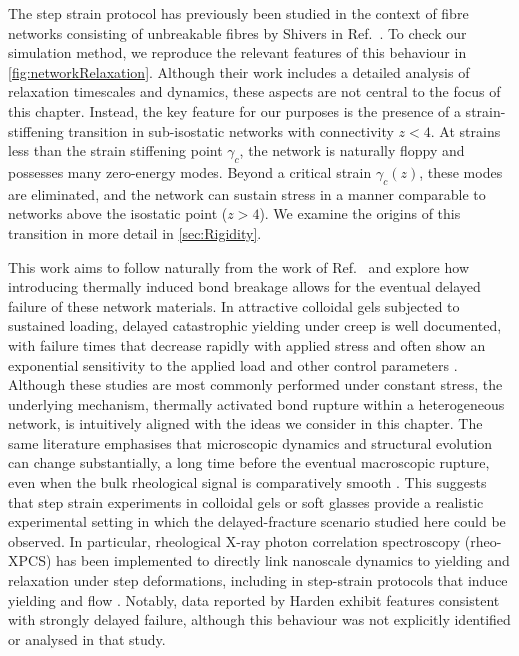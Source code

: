 The step strain protocol has previously been studied in the context of fibre networks consisting of unbreakable fibres by Shivers \etal in Ref.~\cite{shivers_strain-controlled_2023}. To check our simulation method, we reproduce the relevant features of this behaviour in \cref{fig:networkRelaxation}. Although their work includes a detailed analysis of relaxation timescales and dynamics, these aspects are not central to the focus of this chapter. Instead, the key feature for our purposes is the presence of a strain-stiffening transition in sub-isostatic networks with connectivity $z<4$. At strains less than the strain stiffening point $\gamma_c$, the network is naturally floppy and possesses many zero-energy modes. Beyond a critical strain $\gamma_c(z)$, these modes are eliminated, and the network can sustain stress in a manner comparable to networks above the isostatic point ($z>4$). We examine the origins of this transition in more detail in \cref{sec:Rigidity}.

This work aims to follow naturally from the work of Ref.~\cite{lockwood_ultradelayed_2025} and explore how introducing thermally induced bond breakage allows for the eventual delayed failure of these network materials. In attractive colloidal gels subjected to sustained loading, delayed catastrophic yielding under creep is well documented, with failure times that decrease rapidly with applied stress and often show an exponential sensitivity to the applied load and other control parameters \cite{sprakel_stress_2011,blindstrom_structures_2012,Landrum2016,Brenner2013}. Although these studies are most commonly performed under constant stress, the underlying mechanism, thermally activated bond rupture within a heterogeneous network, is intuitively aligned with the ideas we consider in this chapter. The same literature emphasises that microscopic dynamics and structural evolution can change substantially, a long time before the eventual macroscopic rupture, even when the bulk rheological signal is comparatively smooth \cite{blindstrom_structures_2012}. This suggests that step strain experiments in colloidal gels or soft glasses provide a realistic experimental setting in which the delayed-fracture scenario studied here could be observed. In particular, rheological X-ray photon correlation spectroscopy (rheo-XPCS) \cite{Leheny2015} has been implemented to directly link nanoscale dynamics to yielding and relaxation under step deformations, including in step-strain protocols that induce yielding and flow \cite{Chen2020,Bellour2003}. Notably, data reported by Harden \etal \cite{Chen2020} exhibit features consistent with strongly delayed failure, although this behaviour was not explicitly identified or analysed in that study.

